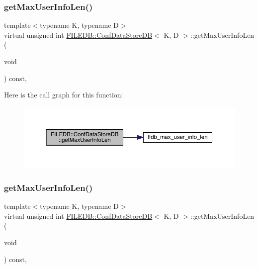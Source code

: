 \subsubsection{\texorpdfstring{getMaxUserInfoLen()}{getMaxUserInfoLen()}\hspace{0.1cm}{\footnotesize\ttfamily [1/2]}}
{\footnotesize\ttfamily template$<$typename K, typename D$>$ \\
virtual unsigned int \mbox{\hyperlink{classFILEDB_1_1ConfDataStoreDB}{F\+I\+L\+E\+D\+B\+::\+Conf\+Data\+Store\+DB}}$<$ K, D $>$\+::get\+Max\+User\+Info\+Len (\begin{DoxyParamCaption}\item[{void}]{ }\end{DoxyParamCaption}) const\hspace{0.3cm}{\ttfamily [inline]}, {\ttfamily [virtual]}}

Here is the call graph for this function\+:
\nopagebreak
\begin{figure}[H]
\begin{center}
\leavevmode
\includegraphics[width=350pt]{d8/d19/classFILEDB_1_1ConfDataStoreDB_a0fc37111156b6c7080ff6a6831c847fc_cgraph}
\end{center}
\end{figure}
\mbox{\label{classFILEDB_1_1ConfDataStoreDB_a0fc37111156b6c7080ff6a6831c847fc}} 
\subsubsection{\texorpdfstring{getMaxUserInfoLen()}{getMaxUserInfoLen()}\hspace{0.1cm}{\footnotesize\ttfamily [2/2]}}
{\footnotesize\ttfamily template$<$typename K, typename D$>$ \\
virtual unsigned int \mbox{\hyperlink{classFILEDB_1_1ConfDataStoreDB}{F\+I\+L\+E\+D\+B\+::\+Conf\+Data\+Store\+DB}}$<$ K, D $>$\+::get\+Max\+User\+Info\+Len (\begin{DoxyParamCaption}\item[{void}]{ }\end{DoxyParamCaption}) const\hspace{0.3cm}{\ttfamily [inline]}, {\ttfamily [virtual]}}

